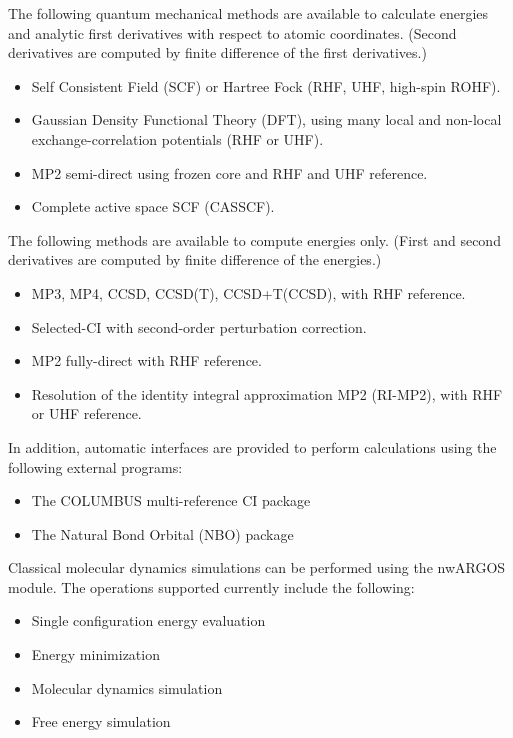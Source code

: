The following quantum mechanical methods are available to calculate
energies and analytic first derivatives with respect to atomic
coordinates.  (Second derivatives are computed by finite difference of
the first derivatives.)

\begin{itemize}
\item Self Consistent Field (SCF) or Hartree Fock (RHF, UHF, high-spin
  ROHF).  
\item Gaussian Density Functional Theory (DFT), using many local and
  non-local exchange-correlation potentials (RHF or UHF).
\item MP2 semi-direct using frozen core and RHF and UHF reference.
\item Complete active space SCF (CASSCF).
\end{itemize}

The following methods are available to compute energies only.  (First
and second derivatives are computed by finite difference of the
energies.)
\begin{itemize}
\item MP3, MP4, CCSD, CCSD(T), CCSD+T(CCSD), with RHF reference.
\item Selected-CI with second-order perturbation correction.
\item MP2 fully-direct with RHF reference.
\item Resolution of the identity integral approximation MP2 (RI-MP2), with
  RHF or UHF reference.
\end{itemize}

In addition, automatic interfaces are provided to perform calculations using
the following external programs:
\begin{itemize}
\item The COLUMBUS multi-reference CI package
\item The Natural Bond Orbital (NBO) package
\end{itemize}

Classical molecular dynamics simulations can be performed using the nwARGOS module.
The operations supported currently include the following:

\begin{itemize}
\item Single configuration energy evaluation
\item Energy minimization
\item Molecular dynamics simulation
\item Free energy simulation 
\end{itemize}

